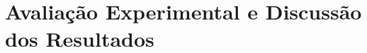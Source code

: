 

\chapter{Avaliação Experimental e Discussão dos Resultados}%
\label{cha:avaliacao_experimental_e_discussao_dos_resultados}



